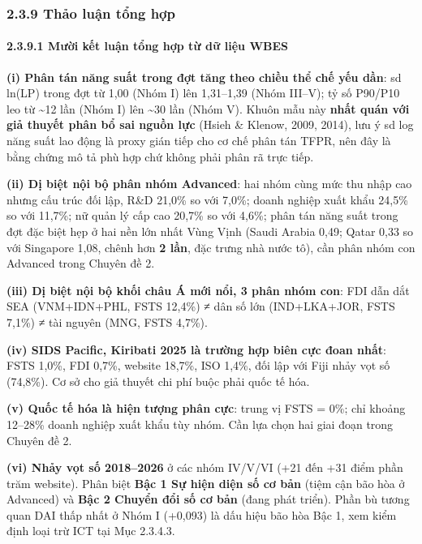 \documentclass[
  a4paper,
  13pt]{extreport}
\begin{document}
\hypertarget{thux1ea3o-luux1eadn-tux1ed5ng-hux1ee3p}{%
\subsubsection{2.3.9 Thảo luận tổng
hợp}\label{thux1ea3o-luux1eadn-tux1ed5ng-hux1ee3p}}

\hypertarget{mux1b0ux1eddi-kux1ebft-luux1eadn-tux1ed5ng-hux1ee3p-tux1eeb-dux1eef-liux1ec7u-wbes}{%
\paragraph{2.3.9.1 Mười kết luận tổng hợp từ dữ liệu
WBES}\label{mux1b0ux1eddi-kux1ebft-luux1eadn-tux1ed5ng-hux1ee3p-tux1eeb-dux1eef-liux1ec7u-wbes}}

\textbf{(i) Phân tán năng suất trong đợt tăng theo chiều thể chế yếu
dần}: sd ln(LP) trong đợt từ 1,00 (Nhóm I) lên 1,31--1,39 (Nhóm III--V);
tỷ số P90/P10 leo từ \textasciitilde12 lần (Nhóm I) lên
\textasciitilde30 lần (Nhóm V). Khuôn mẫu này \textbf{nhất quán với giả
thuyết phân bổ sai nguồn lực} (Hsieh \& Klenow, 2009, 2014), lưu ý sd
log năng suất lao động là proxy gián tiếp cho cơ chế phân tán TFPR, nên
đây là bằng chứng mô tả phù hợp chứ không phải phân rã trực tiếp.

\textbf{(ii) Dị biệt nội bộ phân nhóm Advanced}: hai nhóm cùng mức thu
nhập cao nhưng cấu trúc đối lập, R\&D 21,0\% so với 7,0\%; doanh nghiệp
xuất khẩu 24,5\% so với 11,7\%; nữ quản lý cấp cao 20,7\% so với 4,6\%;
phân tán năng suất trong đợt đặc biệt hẹp ở hai nền lớn nhất Vùng Vịnh
(Saudi Arabia 0,49; Qatar 0,33 so với Singapore 1,08, chênh hơn
\textbf{2 lần}, đặc trưng nhà nước tô), cần phân nhóm con Advanced trong
Chuyên đề 2.

\textbf{(iii) Dị biệt nội bộ khối châu Á mới nổi, 3 phân nhóm con}: FDI
dẫn dắt SEA (VNM+IDN+PHL, FSTS 12,4\%) ≠ dân số lớn (IND+LKA+JOR, FSTS
7,1\%) ≠ tài nguyên (MNG, FSTS 4,7\%).

\textbf{(iv) SIDS Pacific, Kiribati 2025 là trường hợp biên cực đoan
nhất}: FSTS 1,0\%, FDI 0,7\%, website 18,7\%, ISO 1,4\%, đối lập với
Fiji nhảy vọt số (74,8\%). Cơ sở cho giả thuyết chi phí buộc phải quốc
tế hóa.

\textbf{(v) Quốc tế hóa là hiện tượng phân cực}: trung vị FSTS = 0\%;
chỉ khoảng 12--28\% doanh nghiệp xuất khẩu tùy nhóm. Cần lựa chọn hai
giai đoạn trong Chuyên đề 2.

\textbf{(vi) Nhảy vọt số 2018--2026} ở các nhóm IV/V/VI (+21 đến +31
điểm phần trăm website). Phân biệt \textbf{Bậc 1 Sự hiện diện số cơ bản}
(tiệm cận bão hòa ở Advanced) và \textbf{Bậc 2 Chuyển đổi số cơ bản}
(đang phát triển). Phần bù tương quan DAI thấp nhất ở Nhóm I (+0,093) là
dấu hiệu bão hòa Bậc 1, xem kiểm định loại trừ ICT tại Mục 2.3.4.3.
\end{document}
